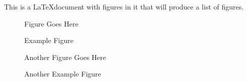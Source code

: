 \documentclass[11pt]{article}
\begin{document}

This is a \LaTeX document with figures in it that
will produce a list of figures.

\begin{figure}[ht]
\centering
Figure Goes Here
\caption{Example Figure}
\label{fig:myfig}
\end{figure}

\begin{figure}[ht]
\centering
Another Figure Goes Here
\caption{Another Example Figure}
\label{fig:yourfig}
\end{figure}
\end{document}
